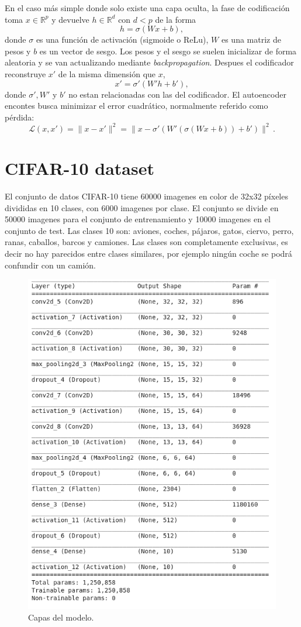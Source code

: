 \documentclass[
  a4paper,
  12pt,
  spanish,
]{scrartcl}
\theoremstyle{teorema-style}
\begin{document}
En el caso más simple donde solo existe una capa oculta, la fase de codificación
toma $x \in \mathbb{R}^p$ y devuelve $h \in \mathbb{R}^d$ con $d < p$ de la
forma
\[
h = \sigma (Wx+b),
\]
donde $\sigma$ es una función de activación (sigmoide o ReLu), $W$ es una matriz
de pesos y $b$ es un vector de sesgo. Los pesos y el sesgo se suelen inicializar
de forma aleatoria y se van actualizando mediante \textit{backpropagation}.
Despues el codificador reconstruye $x'$ de la misma dimensión que $x$,
\[
x' = \sigma' (W'h + b'),
\]
donde $\sigma', W'$ y $b'$ no estan relacionadas con las del codificador. El autoencoder encontes busca minimizar el error cuadrático, normalmente
referido como pérdida:
\[
\mathcal{L}(x,x') = \|x-x'\|^2 = \|x - \sigma'(W'(\sigma(Wx + b))+b')\|^2\,.
\]

\section{CIFAR-10 dataset}
El conjunto de datos CIFAR-10 tiene 60000 imagenes en color de 32x32 píxeles divididas en 10 clases, con 6000 imagenes por clase. El conjunto se divide en 50000 imagenes para el conjunto de entrenamiento y 10000 imagenes en el conjunto de test.
Las clases 10 son: aviones, coches, pájaros, gatos, ciervo, perro, ranas, caballos, barcos y camiones.
Las clases son completamente exclusivas, es decir no hay parecidos entre clases similares, por ejemplo ningún coche se podrá confundir con un camión.

\begin{figure}[h]
  \centering
  \includegraphics[width=.8\textwidth]{img/model}
  \caption{Capas del modelo.}
  \label{fig:model}
\end{figure}


\newpage
\printbibliography
\end{document}
